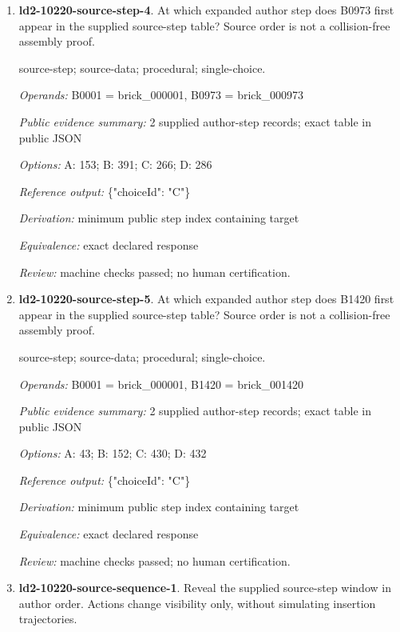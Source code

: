 \begin{enumerate}
\item \textbf{ld2-10220-source-step-4}. At which expanded author step does B0973 first appear in the supplied source-step table? Source order is not a collision-free assembly proof.
\par{\small source-step; source-data; procedural; single-choice.\par\textit{Operands:} B0001 = brick\_000001, B0973 = brick\_000973\par\textit{Public evidence summary:} 2 supplied author-step records; exact table in public JSON\par\textit{Options:} A: 153; B: 391; C: 266; D: 286\par\textit{Reference output:} \{"choiceId": "C"\}\par\textit{Derivation:} minimum public step index containing target\par\textit{Equivalence:} exact declared response\par\textit{Review:} machine checks passed; no human certification.}
\item \textbf{ld2-10220-source-step-5}. At which expanded author step does B1420 first appear in the supplied source-step table? Source order is not a collision-free assembly proof.
\par{\small source-step; source-data; procedural; single-choice.\par\textit{Operands:} B0001 = brick\_000001, B1420 = brick\_001420\par\textit{Public evidence summary:} 2 supplied author-step records; exact table in public JSON\par\textit{Options:} A: 43; B: 152; C: 430; D: 432\par\textit{Reference output:} \{"choiceId": "C"\}\par\textit{Derivation:} minimum public step index containing target\par\textit{Equivalence:} exact declared response\par\textit{Review:} machine checks passed; no human certification.}
\item \textbf{ld2-10220-source-sequence-1}. Reveal the supplied source-step window in author order. Actions change visibility only, without simulating insertion trajectories.

\end{enumerate}
